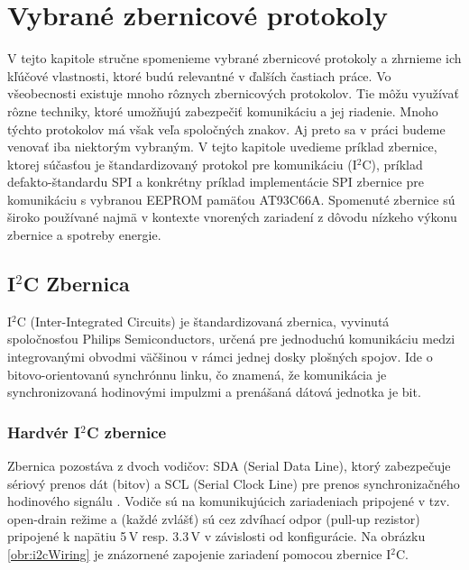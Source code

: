 \chapter{Vybrané zbernicové protokoly}
\label{kap:protokoly}

V tejto kapitole stručne spomenieme vybrané zbernicové protokoly a zhrnieme ich kľúčové vlastnosti, ktoré budú relevantné v ďalších častiach práce. Vo všeobecnosti existuje mnoho rôznych zbernicových protokolov. Tie môžu využívať rôzne techniky, ktoré umožňujú zabezpečiť komunikáciu a jej riadenie. Mnoho týchto protokolov má však veľa spoločných znakov. Aj preto sa v práci budeme venovať iba niektorým vybraným. V tejto kapitole uvedieme príklad zbernice, ktorej súčasťou je štandardizovaný protokol pre komunikáciu (I$^2$C), príklad defakto-štandardu SPI a konkrétny príklad implementácie SPI zbernice pre komunikáciu s vybranou EEPROM pamäťou AT93C66A. Spomenuté zbernice sú široko používané najmä v kontexte vnorených zariadení z dôvodu nízkeho výkonu zbernice a spotreby energie.

\section{I$^2$C Zbernica}
I$^2$C (Inter-Integrated Circuits) je štandardizovaná zbernica, vyvinutá spoločnosťou Philips Semiconductors, určená pre jednoduchú komunikáciu medzi integrovanými obvodmi \cite{i2cBus} väčšinou v rámci jednej dosky plošných spojov. Ide o bitovo-orientovanú synchrónnu linku, čo znamená, že komunikácia je synchronizovaná hodinovými impulzmi a prenášaná dátová jednotka je bit.

\subsection{Hardvér I$^2$C zbernice}
Zbernica pozostáva z dvoch vodičov: SDA (Serial Data Line), ktorý zabezpečuje sériový prenos dát (bitov) a SCL (Serial Clock Line) pre prenos synchronizačného hodinového signálu \cite{i2cBus}. Vodiče sú na komunikujúcich zariadeniach pripojené v tzv. open-drain režime a (každé zvlášť) sú cez zdvíhací odpor (pull-up rezistor) pripojené k napätiu 5\,V resp. 3.3\,V v závislosti od konfigurácie. Na obrázku \ref{obr:i2cWiring} je znázornené zapojenie zariadení pomocou zbernice I$^2$C.

